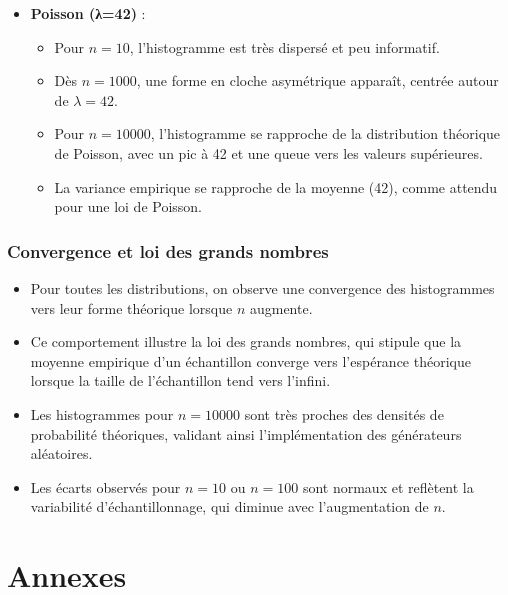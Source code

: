 \documentclass{article}
\begin{document}
\begin{itemize}[leftmargin=*, noitemsep]
    \item \textbf{Poisson (λ=42)} :
    \begin{itemize}[leftmargin=*, noitemsep]
        \item Pour \( n = 10 \), l'histogramme est très dispersé et peu informatif.
        \item Dès \( n = 1000 \), une forme en cloche asymétrique apparaît, centrée autour de \( \lambda = 42 \).
        \item Pour \( n = 10000 \), l'histogramme se rapproche de la distribution théorique de Poisson, avec un pic à 42 et une queue vers les valeurs supérieures.
        \item La variance empirique se rapproche de la moyenne (42), comme attendu pour une loi de Poisson.
    \end{itemize}
\end{itemize}

\subsubsection{Convergence et loi des grands nombres}
\begin{itemize}[leftmargin=*, noitemsep]
    \item Pour toutes les distributions, on observe une convergence des histogrammes vers leur forme théorique lorsque \( n \) augmente.
    \item Ce comportement illustre la loi des grands nombres, qui stipule que la moyenne empirique d'un échantillon converge vers l'espérance théorique lorsque la taille de l'échantillon tend vers l'infini.
    \item Les histogrammes pour \( n = 10000 \) sont très proches des densités de probabilité théoriques, validant ainsi l'implémentation des générateurs aléatoires.
    \item Les écarts observés pour \( n = 10 \) ou \( n = 100 \) sont normaux et reflètent la variabilité d'échantillonnage, qui diminue avec l'augmentation de \( n \).
\end{itemize}

\section{Annexes}
\end{document}
